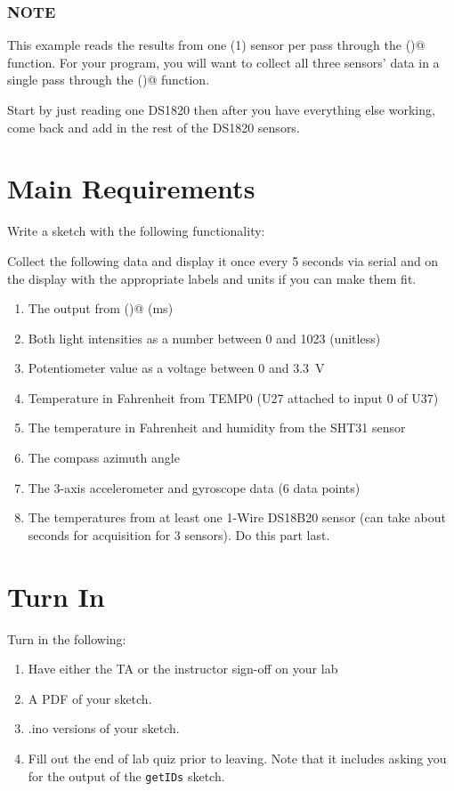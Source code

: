 \subsubsection{NOTE}
This example reads the results from one (1) sensor per pass through the 
\lstinline@loop()@ function. For your program, you will want to collect 
all three sensors' data in a single pass through the \lstinline@loop()@ 
function. 

Start by just reading one DS1820 then after you have everything
else working, come back and add in the rest of the DS1820 sensors.

\section{Main Requirements}
Write a sketch with the following functionality:

Collect the following data and display it once every 5 seconds via serial and on 
the display with the appropriate labels and units if you can make them fit.
\begin{enumerate}
	\item The output from \lstinline@millis()@ (ms)
	\item Both light intensities as a number between 0 and 1023 (unitless)
	\item Potentiometer value as a voltage between 0 and 3.3~V
	\item Temperature in Fahrenheit from TEMP0 (U27 attached to input 0 of U37)
	\item The temperature in Fahrenheit and humidity from the SHT31 sensor
	\item The compass azimuth angle
	\item The 3-axis accelerometer and gyroscope data (6 data points)
 	\item The temperatures from at least one 1-Wire DS18B20 sensor (can take about
            seconds for acquisition for 3 sensors). Do this part last.
\end{enumerate}

\section{Turn In}
Turn in the following:
\begin{enumerate}
    \item Have either the TA or the instructor sign-off on your lab
    \item A PDF of your sketch.
    \item .ino versions of your sketch.
    \item Fill out the end of lab quiz prior to leaving. Note that it includes asking you 
            for the output of the \lstinline$getIDs$ sketch. 
\end{enumerate}


